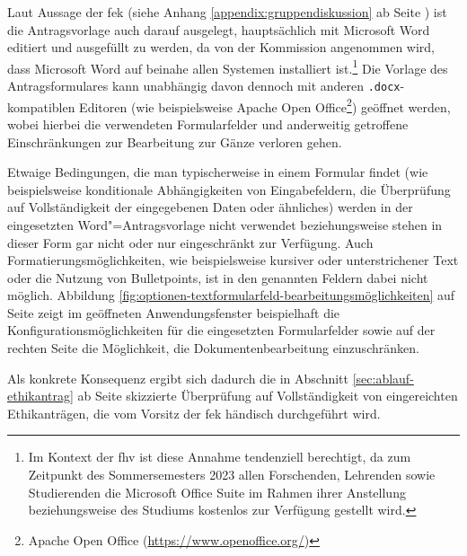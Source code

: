 \documentclass[a4paper,12pt,twoside]{scrreprt}
\begin{document}
Laut Aussage der \acl{fek} (siehe Anhang \ref{appendix:gruppendiskussion} ab Seite \pageref{appendix:gruppendiskussion}) ist die Antragsvorlage auch darauf ausgelegt, hauptsächlich mit Microsoft Word editiert und ausgefüllt zu werden, da von der Kommission angenommen wird, dass Microsoft Word auf beinahe allen Systemen installiert ist.\footnote{Im Kontext der \acl{fhv} ist diese Annahme tendenziell berechtigt, da zum Zeitpunkt des Sommersemesters 2023 allen Forschenden, Lehrenden sowie Studierenden die Microsoft Office Suite im Rahmen ihrer Anstellung beziehungsweise des Studiums kostenlos zur Verfügung gestellt wird.} Die Vorlage des Antragsformulares kann unabhängig davon dennoch mit anderen \texttt{.docx}-kompatiblen Editoren (wie beispielsweise Apache Open Office\footnote{Apache Open Office (\url{https://www.openoffice.org/})}) geöffnet werden, wobei hierbei die verwendeten Formularfelder und anderweitig getroffene Einschränkungen zur Bearbeitung zur Gänze verloren gehen.

Etwaige Bedingungen, die man typischerweise in einem Formular findet (wie beispielsweise konditionale Abhängigkeiten von Eingabefeldern, die Überprüfung auf Vollständigkeit der eingegebenen Daten oder ähnliches) werden in der eingesetzten Word"=Antragsvorlage nicht verwendet beziehungsweise stehen in dieser Form gar nicht oder nur eingeschränkt zur Verfügung. Auch Formatierungsmöglichkeiten, wie beispielsweise kursiver oder unterstrichener Text oder die Nutzung von Bulletpoints, ist in den genannten Feldern dabei nicht möglich.
Abbildung \ref{fig:optionen-textformularfeld-bearbeitungsmöglichkeiten} auf Seite \pageref{fig:optionen-textformularfeld-bearbeitungsmöglichkeiten} zeigt im geöffneten Anwendungsfenster beispielhaft die Konfigurationsmöglichkeiten für die eingesetzten Formularfelder sowie auf der rechten Seite die Möglichkeit, die Dokumentenbearbeitung einzuschränken.

Als konkrete Konsequenz ergibt sich dadurch die in Abschnitt \ref{sec:ablauf-ethikantrag} ab Seite \pageref{sec:ablauf-ethikantrag} skizzierte Überprüfung auf Vollständigkeit von eingereichten Ethikanträgen, die vom Vorsitz der \ac{fek} händisch durchgeführt wird.
\end{document}
